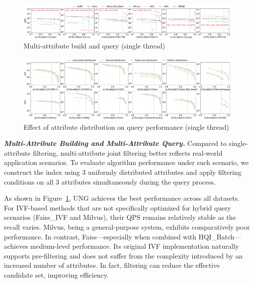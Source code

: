 \documentclass[sigconf, nonacm]{acmart}
\begin{document}
\begin{figure}
        \centering
        \setlength{\abovecaptionskip}{0.1cm}
        \setlength{\belowcaptionskip}{-0.4cm}
        \includegraphics[width=\textwidth]{figures/exp/exp_4_1_MultiLabel_1thread.pdf}
        \caption{Multi-attribute build and query (single thread)}
        \label{fig:exp_4_1_MultiLabel_1thread}
\end{figure}

\begin{figure}
        \centering
\setlength{\abovecaptionskip}{0.1cm}
\setlength{\belowcaptionskip}{-0.4cm}
        \includegraphics[width=\textwidth]{figures/exp/exp_3_1.pdf}
        \caption{Effect of attribute distribution on query performance (single thread)}
        \label{fig:exp_3_1}
\end{figure}





\textit{\textbf{Multi-Attribute Building and Multi-Attribute Query.}}  
Compared to single-attribute filtering, multi-attribute joint filtering better reflects real-world application scenarios. To evaluate algorithm performance under such scenario, we construct the index using 3 uniformly distributed attributes and apply filtering conditions on all 3 attributes simultaneously during the query process.

As shown in Figure~\ref{fig:exp_4_1_MultiLabel_1thread}, UNG achieves the best performance across all datasets. For IVF-based methods that are not specifically optimized for hybrid query scenarios (Faiss\_IVF and Milvus), their QPS remains relatively stable as the recall varies. Milvus, being a general-purpose system, exhibits comparatively poor performance. In contrast, Faiss—especially when combined with HQI\_Batch—achieves medium-level performance. Its original IVF implementation naturally supports pre-filtering and does not suffer from the complexity introduced by an increased number of attributes. In fact, filtering can reduce the effective candidate set, improving efficiency.
\end{document}
